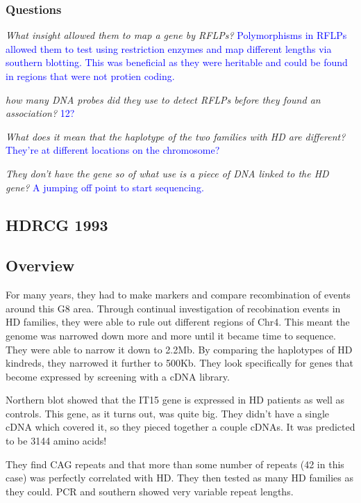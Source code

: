 \subsubsection*{Questions}

\textit{What insight allowed them to map a gene by RFLPs?} \textcolor{blue}{Polymorphisms in RFLPs allowed them to test using restriction enzymes and map different lengths via southern blotting. This was beneficial as they were heritable and could be found in regions that were not protien coding.}

\textit{how many DNA probes did they use to detect RFLPs before they found an association?} \textcolor{blue}{12?}

\textit{What does it mean that the haplotype of the two families with HD are different?} \textcolor{blue}{They're at different locations on the chromosome?}

\textit{They don't have the gene so of what use is a piece of DNA linked to the HD gene?} \textcolor{blue}{A jumping off point to start sequencing.}

\subsection*{HDRCG 1993}


\subsection*{Overview}

For many years, they had to make markers and compare recombination of events around this G8 area. Through continual investigation of recobination events in HD families, they were able to rule out different regions of Chr4. This meant the genome was narrowed down more and more until it became time to sequence. They were able to narrow it down to 2.2Mb. By comparing the haplotypes of HD kindreds, they narrowed it further to 500Kb. They look specifically for genes that become expressed by screening with a cDNA library. \newline

Northern blot showed that the IT15 gene is expressed in HD patients as well as controls. This gene, as it turns out, was quite big. They didn't have a single cDNA which covered it, so they pieced together a couple cDNAs. It was predicted to be 3144 amino acids!\newline

They find CAG repeats and that more than some number of repeats (42 in this case) was perfectly correlated with HD. They then tested as many HD families as they could. PCR and southern showed very variable repeat lengths. 

